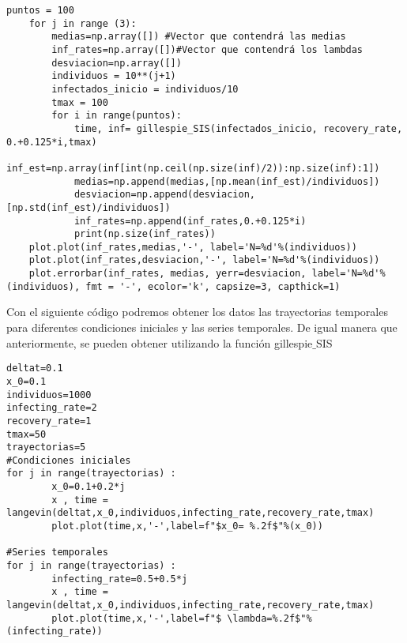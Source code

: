 \begin{lstlisting}[frame=single]
    puntos = 100
    for j in range (3):
        medias=np.array([]) #Vector que contendrá las medias
        inf_rates=np.array([])#Vector que contendrá los lambdas
        desviacion=np.array([])
        individuos = 10**(j+1)
        infectados_inicio = individuos/10
        tmax = 100
        for i in range(puntos):
            time, inf= gillespie_SIS(infectados_inicio, recovery_rate, 0.+0.125*i,tmax)
            inf_est=np.array(inf[int(np.ceil(np.size(inf)/2)):np.size(inf):1])
            medias=np.append(medias,[np.mean(inf_est)/individuos]) 
            desviacion=np.append(desviacion,[np.std(inf_est)/individuos])
            inf_rates=np.append(inf_rates,0.+0.125*i)
            print(np.size(inf_rates))
    plot.plot(inf_rates,medias,'-', label='N=%d'%(individuos))
    plot.plot(inf_rates,desviacion,'-', label='N=%d'%(individuos)) 
    plot.errorbar(inf_rates, medias, yerr=desviacion, label='N=%d'%(individuos), fmt = '-', ecolor='k', capsize=3, capthick=1)   
\end{lstlisting}    
\newpage
Con el siguiente código podremos obtener los datos las trayectorias temporales para diferentes condiciones iniciales y las series temporales. 
De igual manera que anteriormente, se pueden obtener utilizando la función gillespie$\_$SIS

\begin{lstlisting}[frame=single]
deltat=0.1
x_0=0.1
individuos=1000
infecting_rate=2
recovery_rate=1
tmax=50
trayectorias=5
#Condiciones iniciales
for j in range(trayectorias) :
        x_0=0.1+0.2*j
        x , time = langevin(deltat,x_0,individuos,infecting_rate,recovery_rate,tmax)
        plot.plot(time,x,'-',label=f"$x_0= %.2f$"%(x_0))

#Series temporales
for j in range(trayectorias) :
        infecting_rate=0.5+0.5*j
        x , time = langevin(deltat,x_0,individuos,infecting_rate,recovery_rate,tmax)
        plot.plot(time,x,'-',label=f"$ \lambda=%.2f$"%(infecting_rate))
\end{lstlisting}  

